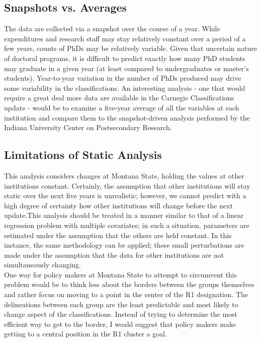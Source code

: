 \documentclass{article}
\begin{document}
  \subsection{Snapshots vs. Averages}
  The data are collected via a snapshot over the course of a year. While expenditures and research staff may stay relatively constant over a period of a few years, counts of PhDs may be relatively variable. Given that uncertain nature of doctoral programs, it is difficult to predict exactly how many PhD students may graduate in a given year (at least compared to undergraduates or master's students). Year-to-year variation in the number of PhDs produced may drive some variability in the classifications. An interesting analysis - one that would require a great deal more data are available in the Carnegie Classifications update - would be to examine a five-year average of all the variables at each institution and compare them to the snapshot-driven analysis performed by the Indiana University Center on Postsecondary Research. 
  
  
  \subsection{Limitations of Static Analysis}
This analysis considers changes at Montana State, holding the values at other institutions constant. Certainly, the assumption that other institutions will stay static over the next five years is unrealistic; however, we cannot predict with a high degree of certainty how other institutions will change before the next update.This analysis should be treated in a manner similar to that of a linear regression problem with multiple covariates; in such a situation, parameters are estimated under the assumption that the others are held constant. In this instance, the same methodology can be applied; these small perturbations are made under the assumption that the data for other institutions are not simultaneously changing. \\

One way for policy makers at Montana State to attempt to circumvent this problem would be to think less about the borders between the groups themselves and rather focus on moving to a point in the center of the R1 designation. The delineations between each group are the least predictable and most likely to change aspect of the classifications. Instead of trying to determine the most efficient way to get to the border, I would suggest that policy makers make getting to a central position in the R1 cluster a goal.  
\end{document}
